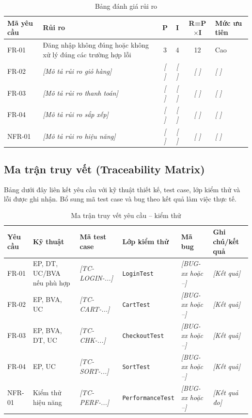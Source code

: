 \documentclass[a4paper,12pt]{article}
\newcommand{\fillin}[1]{\textit{[#1]}}
\begin{document}
\begin{table}[htbp]
\centering
\caption{Bảng đánh giá rủi ro}
\begin{tabularx}{\textwidth}{|p{1.7cm}|X|c|c|c|p{2.3cm}|}
\hline
\textbf{Mã yêu cầu} & \textbf{Rủi ro} & \textbf{P} & \textbf{I} & \textbf{R=P$\times$I} & \textbf{Mức ưu tiên} \\
\hline
FR-01 & Đăng nhập không đúng hoặc không xử lý đúng các trường hợp lỗi & 3 & 4 & 12 & Cao \\
\hline
FR-02 & \fillin{Mô tả rủi ro giỏ hàng} & \fillin{ } & \fillin{ } & \fillin{ } & \fillin{ } \\
\hline
FR-03 & \fillin{Mô tả rủi ro thanh toán} & \fillin{ } & \fillin{ } & \fillin{ } & \fillin{ } \\
\hline
FR-04 & \fillin{Mô tả rủi ro sắp xếp} & \fillin{ } & \fillin{ } & \fillin{ } & \fillin{ } \\
\hline
NFR-01 & \fillin{Mô tả rủi ro hiệu năng} & \fillin{ } & \fillin{ } & \fillin{ } & \fillin{ } \\
\hline
\end{tabularx}
\end{table}

\subsection{Ma trận truy vết (Traceability Matrix)}
Bảng dưới đây liên kết yêu cầu với kỹ thuật thiết kế, test case, lớp kiểm thử và lỗi được ghi nhận. Bổ sung mã test case và bug theo kết quả làm việc thực tế.
\begin{table}[htbp]
\centering
\caption{Ma trận truy vết yêu cầu -- kiểm thử}
\scriptsize
\begin{tabularx}{\textwidth}{|p{1.4cm}|p{2cm}|p{2cm}|p{2.1cm}|p{2.2cm}|X|}
\hline
\textbf{Yêu cầu} & \textbf{Kỹ thuật} & \textbf{Mã test case} & \textbf{Lớp kiểm thử} & \textbf{Mã bug} & \textbf{Ghi chú/kết quả} \\
\hline
FR-01 & EP, DT, UC/BVA nếu phù hợp & \fillin{TC-LOGIN-...} & \texttt{LoginTest} & \fillin{BUG-xx hoặc --} & \fillin{Kết quả} \\
\hline
FR-02 & EP, BVA, UC & \fillin{TC-CART-...} & \texttt{CartTest} & \fillin{BUG-xx hoặc --} & \fillin{Kết quả} \\
\hline
FR-03 & EP, BVA, DT, UC & \fillin{TC-CHK-...} & \texttt{CheckoutTest} & \fillin{BUG-xx hoặc --} & \fillin{Kết quả} \\
\hline
FR-04 & EP, UC & \fillin{TC-SORT-...} & \texttt{SortTest} & \fillin{BUG-xx hoặc --} & \fillin{Kết quả} \\
\hline
NFR-01 & Kiểm thử hiệu năng & \fillin{TC-PERF-...} & \texttt{PerformanceTest} & \fillin{BUG-xx hoặc --} & \fillin{Kết quả đo} \\
\hline
\end{tabularx}
\end{table}
\end{document}

